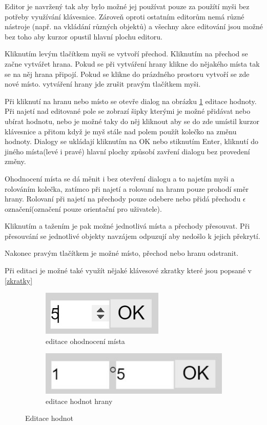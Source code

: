 \documentclass[
  biblatex,
  glossaries,
  index
]{kidiplom}
\begin{document}
Editor je navržený tak aby bylo možné jej používat pouze za použítí 
myši bez potřeby využívání klávesnice. Zároveň oproti ostatním editorům
nemá různé nástroje (např. na vkládání různých objektů) a všechny 
akce editování jsou možné bez toho aby kurzor opustil hlavní plochu editoru.

Kliknutím levým tlačítkem myši se vytvoří přechod. 
Kliknutím na přechod se začne vytvářet hrana. Pokud se při 
vytváření hrany klikne do nějakého místa tak se na něj hrana 
připojí. Pokud se klikne do prázdného prostoru vytvoří se zde nové místo.
vytváření hrany jde zrušit pravým tlačítkem myši.

Při kliknutí na hranu nebo místo se otevře dialog na obrázku \ref{fig:editace hodnot} editace hodnoty.
Při najetí nad editované pole se zobrazí šipky kterými 
je možné přidávat nebo ubírat hodnotu, nebo je možné taky 
do něj kliknout aby se do zde umístil kurzor klávesnice a 
přitom když je myš stále nad polem použít kolečko na změnu hodnoty.
Dialogy se ukládají kliknutím na OK nebo stiknutím Enter, kliknutí do jiného místa(levé i pravé) 
hlavní plochy způsobí zavření dialogu bez provedení změny.

Ohodnocení místa se dá měnit i bez otevření dialogu a to najetím myši
a rolováním kolečka, zatímco při najetí a rolovaní na hranu pouze prohodí směr
hrany. Rolovaní při najetí na přechody pouze odebere nebo přidá přechodu 
$\epsilon$ označení(označení pouze orientační pro uživatele).

Kliknutím a tažením je pak možné jednotlivá místa a přechody přesouvat.
Při přesouvání se jednotlivé objekty navzájem odpuzují aby nedošlo k jejich překrytí.

Nakonec pravým tlačítkem je možné místo, přechod nebo hranu odstranit.

Při editaci je možné také využít nějaké klávesové zkratky které jsou popsané v \ref{zkratky}

\begin{figure}[h]
  \centering
  \begin{subfigure}[h]{0,4\linewidth}
    \includegraphics{dialog_place}
    \caption{editace ohodnocení místa}
  \end{subfigure}
  \begin{subfigure}[h]{0,4\linewidth}
    \includegraphics[width=\linewidth]{dialog_arc}
    \caption{editace hodnot hrany}
  \end{subfigure}
  \caption{Editace hodnot}
  \label{fig:editace hodnot}
\end{figure}
\end{document}
